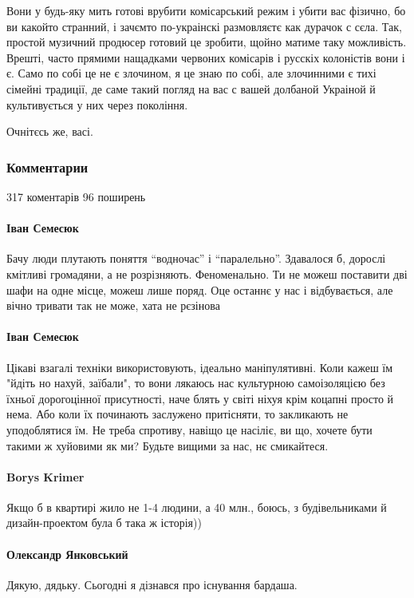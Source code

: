 Вони у будь-яку мить готові врубити комісарський режим і убити вас фізично, бо
ви какойто странний, і зачємто по-украінскі размовляєтє как дурачок с сєла.
Так, простой музичний продюсер готовий це зробити, щойно матиме таку
можливість. Врешті, часто прямими нащадками червоних комісарів і русскіх
колоністів вони і є. Само по собі це не є злочином, я це знаю по собі, але
злочинними є тихі сімейні традиції, де саме такий погляд на вас с вашей
долбаной Украіной й культивується у них через покоління.

Очнітєсь же, васі.

\subsubsection{Комментарии}
317 коментарів 96 поширень

\paragraph{Іван Семесюк}

Бачу люди плутають поняття \enquote{водночас} і \enquote{паралельно}. Здавалося б, дорослі
кмітливі громадяни, а не розрізняють. Феноменально. Ти не можеш поставити дві
шафи на одне місце, можеш лише поряд. Оце останнє у нас і відбувається, але
вічно тривати так не може, хата не рєзінова

\paragraph{Іван Семесюк}

Цікаві взагалі техніки використовують, ідеально маніпулятивні. Коли кажеш їм
"йдіть но нахуй, заїбали", то вони лякаюсь нас культурною самоізоляцією без
їхньої дорогоцінної присутності, наче блять у світі ніхуя крім коцапні просто й
нема. Або коли їх починають заслужено притісняти, то закликають не уподоблятися
їм. Не треба спротиву, навіщо це насіліє, ви що, хочете бути такими ж хуйовими
як ми? Будьте вищими за нас, нє смикайтеся.

\paragraph{Borys Krimer}
Якщо б в квартирі жило не 1-4 людини, а 40 млн., боюсь, з будівельниками й
дизайн-проектом була б така ж історія))

\paragraph{Олександр Янковський}
Дякую, дядьку. Сьогодні я дізнався про існування бардаша.


